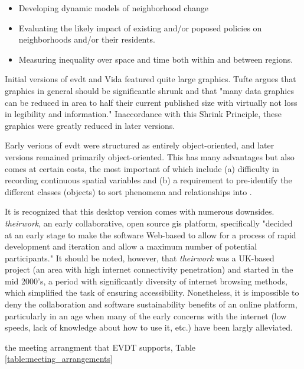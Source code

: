 \begin{itemize}[itemsep=0pt,parsep=0pt]
	\item{Developing dynamic models of neighborhood change}
	\item{Evaluating the likely impact of existing and/or poposed policies on neighborhoods and/or their residents.}
	\item{Measuring inequality over space and time both within and between regions.}
\end{itemize}



Initial versions of \ac{evdt} and Vida featured quite large graphics. Tufte argues that graphics in general should be significantle shrunk and that "many data graphics can be reduced in area to half their current published size with virtually not loss in legibility and information." \cite{tufteVisualDisplayQuantitative2001} Inaccordance with this Shrink Principle, these graphics were greatly reduced in later versions.

Early verions of \ac{evdt} were structured as entirely object-oriented, and later versions remained primarily object-oriented. This has many advantages but also comes at certain costs, the most important of which include (a) difficulty in recording continuous spatial variables and (b) a requirement to pre-identify the different classes (objects) to sort phenomena and relationships into \cite{goodchildModelingEarth2011}. 

It is recognized that this desktop version comes with numerous downsides. \textit{theirwork}, an early collaborative, open source \ac{gis} platform, specifically "decided at an early stage to make the software Web-based to allow for a process of rapid development and iteration and allow a maximum number of potential participants." \cite{williamsonTheirworkDevelopmentSustainable2011} It should be noted, however, that \textit{theirwork} was a UK-based project (an area with high internet connectivity penetration) and started in the mid 2000's, a period with significantly diversity of internet browsing methods, which simplified the task of ensuring accessibility. Nonetheless, it is impossible to deny the collaboration and software sustainability benefits of an online platform, particularly in an age when many of the early concerns with the internet (low speeds, lack of knowledge about how to use it, etc.) \cite{shifterInteractiveMultimediaPlanning1995} have been largly alleviated.

the meeting arrangment that EVDT supports, Table \ref{table:meeting_arrangements}

